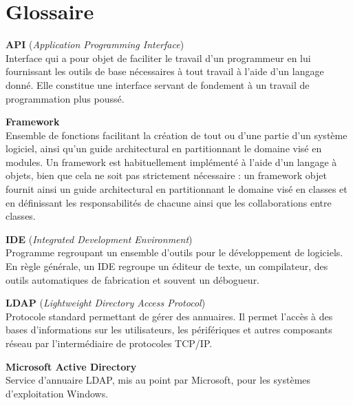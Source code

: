 \chapter*{Glossaire}

\textbf{API} (\textit{Application Programming Interface})\\
Interface qui a pour objet de faciliter le travail d'un programmeur en lui fournissant les outils de base n\'ecessaires \`a tout travail \`a l'aide d'un langage donn\'e.
Elle constitue une interface servant de fondement \`a un travail de programmation plus pouss\'e.

\vspace{0.5cm}

\textbf{Framework}\\
Ensemble de fonctions facilitant la cr\'eation de tout ou d'une partie d'un syst\`eme logiciel, ainsi qu'un guide architectural en partitionnant le domaine vis\'e en modules. 
Un framework est habituellement impl\'ement\'e \`a l'aide d'un langage \`a objets, bien que cela ne soit pas strictement n\'ecessaire : un framework objet fournit ainsi un guide architectural en partitionnant le domaine vis\'e en classes et en d\'efinissant les responsabilit\'es de chacune ainsi que les collaborations entre classes. 

\vspace{0.5cm}

\textbf{IDE} (\textit{Integrated Development Environment})\\
Programme regroupant un ensemble d'outils pour le d\'eveloppement de logiciels.
En r\`egle g\'en\'erale, un IDE regroupe un \'editeur de texte, un compilateur, des outils automatiques de fabrication et souvent un d\'ebogueur.

\vspace{0.5cm}

\textbf{LDAP} (\textit{Lightweight Directory Access Protocol})\\
Protocole standard permettant de g\'erer des annuaires. 
Il permet l'acc\`es \`a des bases d'informations sur les utilisateurs, les p\'erif\'eriques et autres composants r\'eseau par l'interm\'ediaire de protocoles TCP/IP.

\vspace{0.5cm}

\textbf{Microsoft Active Directory}\\
Service d'annuaire LDAP, mis au point par Microsoft, pour les syst\`emes d'exploitation Windows.


